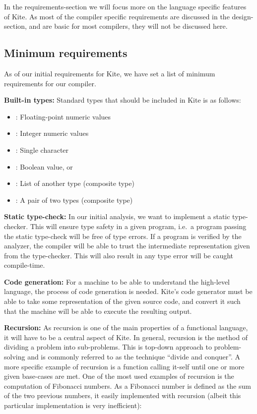 In the requirements-section we will focus more on the language specific features of Kite. As most of the compiler specific requirements are discussed in the design-section, and are basic for most compilers, they will not be discussed here.

\subsection{Minimum requirements}
As of our initial requirements for Kite, we have set a list of minimum requirements for our compiler.

\textbf{Built-in types:} Standard types that should be included in Kite is as follows:
\begin{itemize}
\item {}: Floating-point numeric values
\item {}: Integer numeric values
\item {}: Single character
\item {}: Boolean value,  or 
\item {}: List of another type (composite type)
\item {}: A pair of two types (composite type)
\end{itemize}

\textbf{Static type-check:}
In our initial analysis, we want to implement a static type-checker. This will ensure type safety in a given program, i.e.\ a program passing the static type-check will be free of type errors. If a program is verified by the analyzer, the compiler will be able to trust the intermediate representation given from the type-checker. This will also result in any type error will be caught compile-time.

\textbf{Code generation:}
For a machine to be able to understand the high-level language, the process of code generation is needed. Kite's code generator must be able to take some representation of the given source code, and convert it such that the machine will be able to execute the resulting output.

\textbf{Recursion:}
As recursion is one of the main properties of a functional language, it will have to be a central aspect of Kite. In general, recursion is the method of dividing a problem into sub-problems. This is top-down approach to problem-solving and is commonly referred to as the technique ``divide and conquer''. A more specific example of recursion is a function calling it-self until one or more given base-cases are met. One of the most used examples of recursion is the computation of Fibonacci numbers. As a Fibonacci number is defined as the sum of the two previous numbers, it easily implemented with recursion (albeit this particular implementation is very inefficient):

